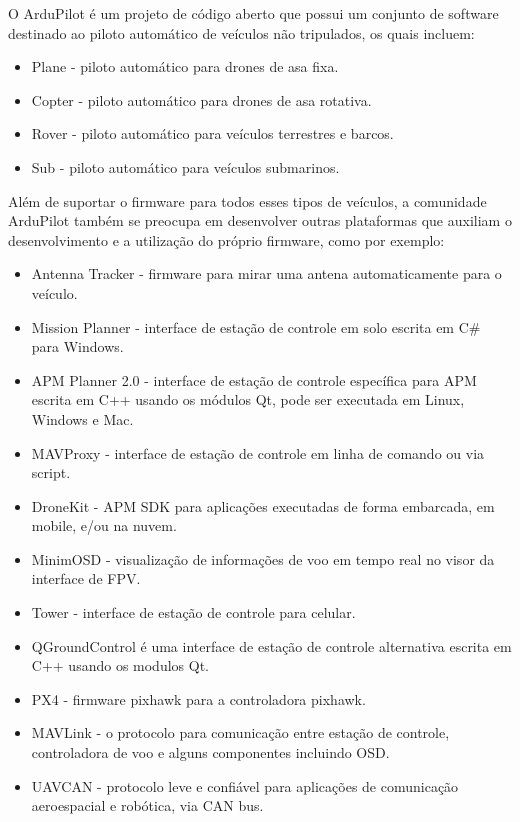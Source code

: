 \documentclass[12pt,a4paper,oneside]{book}
\begin{document}
O ArduPilot é um projeto de código aberto que possui um conjunto de software destinado ao piloto automático de veículos não tripulados, os quais incluem:
\begin{itemize}
  \item Plane - piloto automático para drones de asa fixa.
  \item Copter - piloto automático para drones de asa rotativa.
  \item Rover - piloto automático para veículos terrestres e barcos.
  \item Sub - piloto automático para veículos submarinos.
\end{itemize}

Além de suportar o firmware para todos esses tipos de veículos, a comunidade ArduPilot também se preocupa em desenvolver outras plataformas que auxiliam o desenvolvimento e a utilização do próprio firmware, como por exemplo:

\begin{itemize}
  \item Antenna Tracker - firmware para mirar uma antena automaticamente para o veículo.

  \item Mission Planner - interface de estação de controle em solo escrita em C\# para Windows.
  
  \item APM Planner 2.0 - interface de estação de controle específica para APM escrita em C++ usando os módulos Qt, pode ser executada em Linux, Windows e Mac.
  
  \item MAVProxy - interface de estação de controle em linha de comando ou via script.
  
  \item DroneKit - APM SDK para aplicações executadas de forma embarcada, em mobile, e/ou na nuvem.
  
  \item MinimOSD - visualização de informações de voo em tempo real no visor da interface de FPV.
  \item Tower - interface de estação de controle para celular.  
  \item QGroundControl é uma interface de estação de controle alternativa escrita em C++ usando os modulos Qt.
  \item PX4 - firmware pixhawk para a controladora pixhawk.
  
  \item MAVLink - o protocolo para comunicação entre estação de controle, controladora de voo e alguns componentes incluindo OSD.
  
  \item UAVCAN - protocolo leve e confiável para aplicações de comunicação aeroespacial e robótica, via CAN bus. 
  
\end{itemize}
\end{document}
